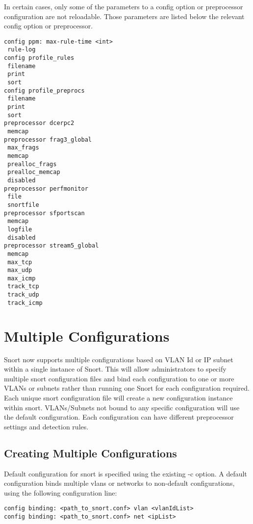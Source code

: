 \documentclass[english]{report}
\begin{document}
In certain cases, only some of the parameters to a config option or
preprocessor configuration are not reloadable.  Those parameters are
listed below the relevant config option or preprocessor.

\begin{verbatim}
config ppm: max-rule-time <int>
 rule-log
config profile_rules
 filename
 print
 sort
config profile_preprocs
 filename
 print
 sort
preprocessor dcerpc2
 memcap
preprocessor frag3_global
 max_frags
 memcap
 prealloc_frags
 prealloc_memcap
 disabled
preprocessor perfmonitor
 file
 snortfile
preprocessor sfportscan
 memcap
 logfile
 disabled
preprocessor stream5_global
 memcap
 max_tcp
 max_udp
 max_icmp
 track_tcp
 track_udp
 track_icmp
\end{verbatim}

\section{Multiple Configurations}

Snort now supports multiple configurations based on VLAN Id or IP subnet within 
a single instance of Snort. This will allow administrators to specify multiple 
snort configuration files and bind each configuration to one or more VLANs or 
subnets rather than running one Snort for each configuration required. Each 
unique snort configuration file will create a new configuration instance within 
snort. VLANs/Subnets not bound to any specific configuration will use the default 
configuration. Each configuration can have different preprocessor settings and 
detection rules.

\subsection{Creating Multiple Configurations}
Default configuration for snort is specified using the existing -c option. A 
default configuration binds multiple vlans or networks to non-default configurations, 
using the following configuration line:

\begin{verbatim}
config binding: <path_to_snort.conf> vlan <vlanIdList>
config binding: <path_to_snort.conf> net <ipList>
\end{verbatim}
\end{document}
